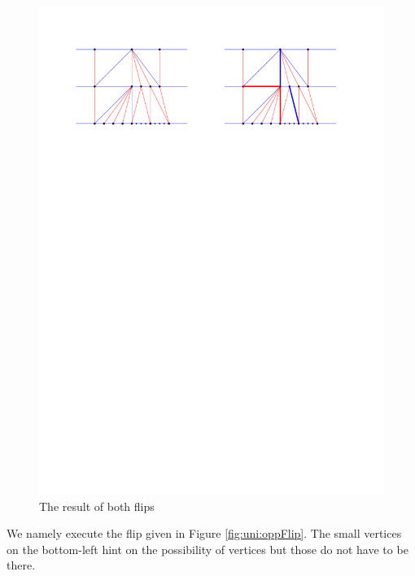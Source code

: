    \begin{figure}[h]
     \centering
     \includegraphics[width =\textwidth]{unifiedAlgo/img/post/sameFlipComplete}
     \caption{The result of both flips}
     \label{fig:uni:sameFlipComplete}
   \end{figure}



   We namely execute the flip given in Figure \ref{fig:uni:oppFlip}. The small vertices on the bottom-left hint on the possibility of vertices but those do not have to be there.

